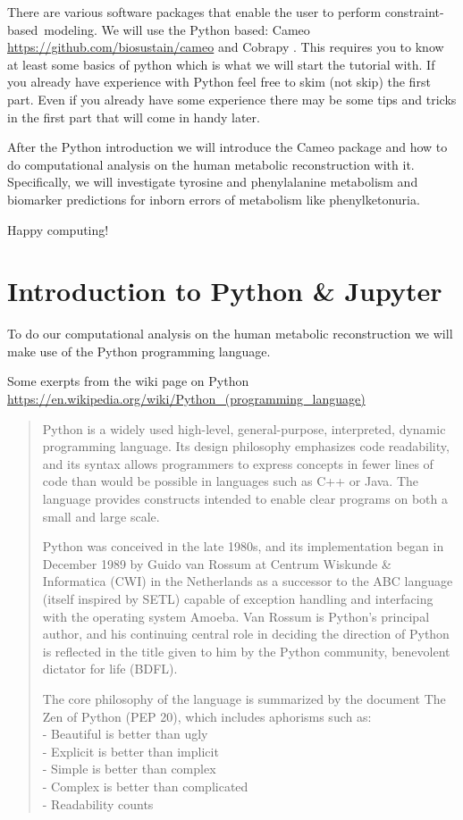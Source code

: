 \documentclass{article}
\begin{document}
There are various software packages that enable the user to perform con\-straint-based~modeling. We will use the Python based: Cameo \url{https://github.com/biosustain/cameo} and Cobrapy \cite{Ebrahim2013}. This requires you to know at least some basics of python which is what we will start the tutorial with. If you already have experience with Python feel free to skim (not skip) the first part. Even if you already have some experience there may be some tips and tricks in the first part that will come in handy later.

After the Python introduction we will introduce the Cameo package and how to do computational analysis on the human metabolic reconstruction with it. Specifically, we will investigate tyrosine and phenylalanine metabolism and biomarker predictions for inborn errors of metabolism like phenylketonuria.

Happy computing!

\section{Introduction to Python \& Jupyter}

To do our computational analysis on the human metabolic reconstruction we will make use of the Python programming language.

Some exerpts from the wiki page on Python \url{https://en.wikipedia.org/wiki/Python_(programming_language)}
\begin{quote}
Python is a widely used high-level, general-purpose, interpreted, dynamic programming language. Its design philosophy emphasizes code readability, and its syntax allows programmers to express concepts in fewer lines of code than would be possible in languages such as C++ or Java. The language provides constructs intended to enable clear programs on both a small and large scale.

Python was conceived in the late 1980s, and its implementation began in December 1989 by Guido van Rossum at Centrum Wiskunde \& Informatica (CWI) in the Netherlands as a successor to the ABC language (itself inspired by SETL) capable of exception handling and interfacing with the operating system Amoeba. Van Rossum is Python's principal author, and his continuing central role in deciding the direction of Python is reflected in the title given to him by the Python community, benevolent dictator for life (BDFL).

The core philosophy of the language is summarized by the document The Zen of Python (PEP 20), which includes aphorisms such as:\\
- Beautiful is better than ugly \\
- Explicit is better than implicit\\
- Simple is better than complex\\
- Complex is better than complicated\\
- Readability counts
\end{quote}
\end{document}
